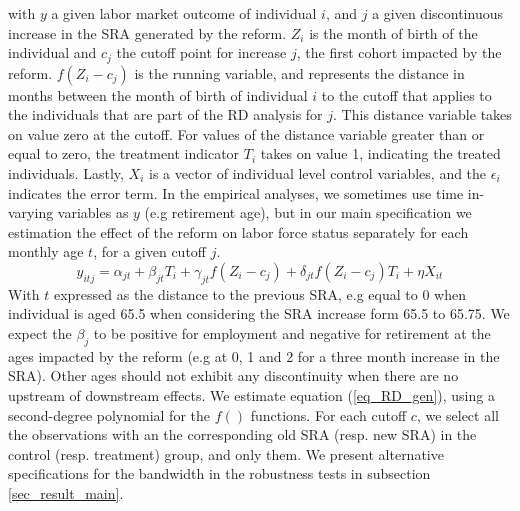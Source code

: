 \documentclass[12pt,a4paper]{article}
\begin{document}
\noindent with $y$ a given labor market outcome of individual $i$, and $j$ a given discontinuous increase in the SRA generated by the reform. $Z_{i}$ is the month of birth of the individual and $c_j$ the cutoff point for increase $j$, the first cohort impacted by the reform. $f(Z_{i}-c_j)$ is the running variable, and represents the distance in months between the month of birth of individual $i$ to the cutoff that applies to the individuals that are part of the RD analysis for $j$. This distance variable takes on value zero at the cutoff. For values of the distance variable greater than or equal to zero, the treatment indicator $T_{i}$ takes on value 1, indicating the treated individuals. Lastly, $X_{i}$ is a vector of individual level control variables, and the $\epsilon_{i}$ indicates the error term. 
In the empirical analyses, we sometimes use time in-varying variables as $y$ (e.g retirement age), but in our main specification we estimation the effect of the reform on labor force status separately for each monthly age $t$, for a given cutoff $j$.
\begin{equation}
	\label{eq_RD_age}
	y_{itj} = \alpha_{jt}  + \beta_{jt}  T_{i} + \gamma_{jt} f(Z_{i} - c_j)  + \delta_{jt} f(Z_{i} - c_j) T_{i} + \eta X_{it} %
\end{equation}
With $t$ expressed as the distance to the previous SRA, e.g equal to 0 when individual is aged 65.5 when considering the SRA increase form 65.5 to 65.75. 
We expect the $\beta_{j}$ to be positive for employment and negative for retirement at the ages impacted by the reform (e.g at 0, 1 and 2 for a three month increase in the SRA). Other ages should not exhibit any discontinuity when there are no upstream of downstream effects. We estimate equation (\ref{eq_RD_gen}), using a second-degree polynomial for the $f()$ functions. For each cutoff $c$, we select all the observations with an the corresponding old SRA (resp. new SRA) in the control (resp. treatment) group, and only them. We present alternative specifications for the bandwidth in the robustness tests in subsection \ref{sec_result_main}.
\end{document}
